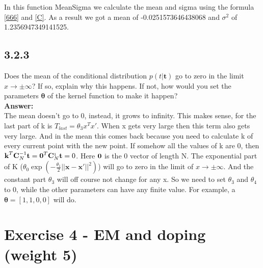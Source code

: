 \documentclass[a4paper]{article}
\begin{document}
In this function MeanSigma we calculate the mean and sigma using the formula \ref{666} and \ref{C}. As a result we got a mean of -0.0251573646438068 and $\sigma^2$ of 1.2356947349141525.


\subsection*{3.2.3}

Does the mean of the conditional distribution $p(t | \textbf{t})$ go to zero in the limit $x \to \pm \infty$? If so, explain why this happens. If not, how would you set the parameters $\boldsymbol{\theta}$ of the kernel function to make it happen?\\

\textbf{Answer:}\\

The mean doesn't go to 0, instead, it grows to infinity. This makes sense, for the last part of k is $T_{last}=\theta_3 x^Tx'$. When x gets very large then this term also gets very large. And in the mean this comes back because you need to calculate k of every current point with the new point. If somehow all the values of k are 0, then $\textbf k^T \textbf C_N^{-1} \textbf t = \textbf 0^T \textbf C_N^{_1} \textbf t = 0$.
Here $\textbf 0$ is the 0 vector of length N. The exponential part of K ($\theta_0 \exp(- \frac{\theta_1}{2} || \textbf{x} - \textbf{x}' ||^2)$) will go to zero in the limit of $x\rightarrow \pm \infty$.
 And the constant part $\theta_3$ will off course not change for any x. So we need to set $\theta_3$ and $\theta_4$ to 0,
  while the other parameters can have any finite value. For example, a $\boldsymbol\theta = [1,1,0,0]$ will do.


\section*{Exercise 4 - EM and doping (weight 5)}
\end{document}
